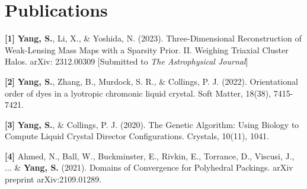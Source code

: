 \documentclass[letterpaper,11pt]{article}
\newcommand{\resumeSubHeadingListStart}{\begin{itemize}[leftmargin=0.15in, label={}]}
\newcommand{\resumeSubHeadingListEnd}{\end{itemize}}
\begin{document}
\section{Publications}
  \vspace{3pt}
  \resumeSubHeadingListStart
    \small{\item{
        \textbf{[1]}{ \textbf{Yang, S.}, Li, X., \& Yoshida, N. (2023). Three-Dimensional Reconstruction of Weak-Lensing Mass Maps with a Sparsity Prior. II. Weighing Triaxial Cluster Halos. arXiv: 2312.00309 [Submitted to \textit{The Astrophysical Journal}]}

    
        \textbf{[2]}{ \textbf{Yang, S.}, Zhang, B., Murdock, S. R., \& Collings, P. J. (2022). Orientational order of dyes in a lyotropic chromonic liquid crystal. Soft Matter, 18(38), 7415-7421. } \\ \vspace{3pt}

        \textbf{[3]}{ \textbf{Yang, S.}, \& Collings, P. J. (2020). The Genetic Algorithm: Using Biology to Compute Liquid Crystal Director Configurations. Crystals, 10(11), 1041. } \\ \vspace{3pt}
    
        \textbf{[4]}{ Ahmed, N., Ball, W., Buckminster, E., Rivkin, E., Torrance, D., Viscusi, J., ... \& \textbf{Yang, S.} (2021). Domains of Convergence for Polyhedral Packings. arXiv preprint arXiv:2109.01289.} \\ \vspace{3pt}
        
        
        
        
    }}
  \resumeSubHeadingListEnd
  
\end{document}
